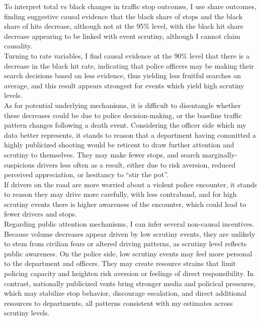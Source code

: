 To interpret total vs black changes in traffic stop outcomes, I use share outcomes, finding suggestive causal evidence that the black share of stops and the black share of hits decrease, although not at the 95\% level, with the black hit share decrease appearing to be linked with event scrutiny, although I cannot claim causality. \\

Turning to rate variables, I find causal evidence at the 90\% level that there is a decrease in the black hit rate, indicating that police officers may be making their search decisions based on less evidence, thus yielding less fruitful searches on average, and this result appears strongest for events which yield high scrutiny levels. \\

As for potential underlying mechanisms, it is difficult to disentangle whether these decreases could be due to police decision-making, or the baseline traffic pattern changes following a death event. Considering the officer side which my data better represents, it stands to reason that a department having committed a highly publicized shooting would be reticent to draw further attention and scrutiny to themselves. They may make fewer stops, and search marginally-suspicious drivers less often as a result, either due to risk aversion, reduced perceived appreciation, or hesitancy to ``stir the pot''. \\

If drivers on the road are more worried about a violent police encounter, it stands to reason they may drive more carefully, with less contraband, and for high scrutiny events there is higher awareness of the encounter, which could lead to fewer drivers and stops. \\

Regarding public attention mechanisms, I can infer several non-causal incentives. Because volume decreases appear driven by low scrutiny events, they are unlikely to stem from civilian fears or altered driving patterns, as scrutiny level reflects public awareness. On the police side, low scrutiny events may feel more personal to the department and officers. They may create resource strains that limit policing capacity and heighten risk aversion or feelings of direct responsibility. In contrast, nationally publicized vents bring stronger media and policical pressures, which may stabilize stop behavior, discourage escalation, and direct additional resources to departments, all patterns consistent with my estimates across scrutiny levels. \\

